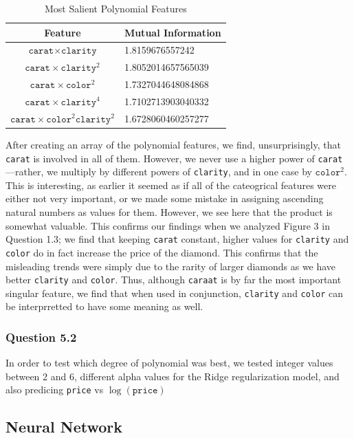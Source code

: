 \documentclass[11pt,letterpaper]{article}
\begin{document}
\begin{table}[ht]
\centering
    \label{table1} 
    \begin{tabular}{cl} 
    \hline
    \multicolumn{1}{c}{Feature} & \multicolumn{1}{c}{Mutual Information}\\
    \hline 
        $\texttt{carat} \times \texttt{clarity}$ & 1.8159676557242 \\
        $\texttt{carat} \times \texttt{clarity}^2$& 1.8052014657565039 \\
        $\texttt{carat} \times \texttt{color}^2$ & 1.7327044648084868 \\
        $\texttt{carat} \times \texttt{clarity}^4$ & 1.7102713903040332 \\
        $\texttt{carat} \times \texttt{color}^2 \texttt{clarity}^2$ & 1.6728060460257277 
    \end{tabular}
    \caption{Most Salient Polynomial Features}
    \end{table}
After creating an array of the polynomial features, we find, unsurprisingly, that \texttt{carat} is involved in all 
of them. However, we never use a higher power of \texttt{carat}—rather, we multiply by different powers of 
\texttt{clarity}, and in one case by $\texttt{color}^2$. This is interesting, as earlier it seemed as if all of the 
cateogrical features were either not very important, or we made some mistake in assigning ascending natural numbers 
as values for them. However, we see here that the product is somewhat valuable. This confirms our findings 
when we analyzed Figure 3 in Question 1.3; we find that keeping \texttt{carat} constant, 
higher values for \texttt{clarity} and \texttt{color} do in fact increase the price of the diamond. This confirms 
that the misleading trends were simply due to the rarity of larger diamonds as we have better \texttt{clarity} and 
\texttt{color}. Thus, although \texttt{caraat} is by far the most important singular feature, we find that when used 
in conjunction, \texttt{clarity} and \texttt{color} can be interprretted to have some meaning as well. 


\subsubsection*{Question 5.2}
In order to test which degree of polynomial was best, we tested integer values between 2 and 6, different alpha
values for the Ridge regularization model, and also predicing \texttt{price} vs $\log(\texttt{price})$

\subsection*{Neural Network}
\end{document}
